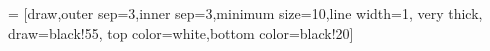 \usetikzlibrary{shadows}
 = [draw,outer sep=3,inner sep=3,minimum size=10,line width=1, very thick, draw=black!55, top color=white,bottom color=black!20]

